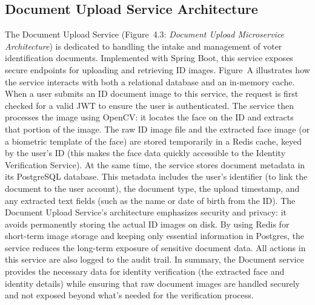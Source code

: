 \documentclass[a4paper,10pt]{report}
\begin{document}
\subsection{Document Upload Service Architecture}
The Document Upload Service (Figure~4.3: \emph{Document Upload Microservice Architecture}) is dedicated to handling the intake and management of voter identification documents. Implemented with Spring Boot, this service exposes secure endpoints for uploading and retrieving ID images. Figure~A illustrates how the service interacts with both a relational database and an in-memory cache. When a user submits an ID document image to this service, the request is first checked for a valid JWT to ensure the user is authenticated. The service then processes the image using OpenCV: it locates the face on the ID and extracts that portion of the image. The raw ID image file and the extracted face image (or a biometric template of the face) are stored temporarily in a Redis cache, keyed by the user’s ID (this makes the face data quickly accessible to the Identity Verification Service). At the same time, the service stores document metadata in its PostgreSQL database. This metadata includes the user’s identifier (to link the document to the user account), the document type, the upload timestamp, and any extracted text fields (such as the name or date of birth from the ID). The Document Upload Service’s architecture emphasizes security and privacy: it avoids permanently storing the actual ID images on disk. By using Redis for short-term image storage and keeping only essential information in Postgres, the service reduces the long-term exposure of sensitive document data. All actions in this service are also logged to the audit trail. In summary, the Document service provides the necessary data for identity verification (the extracted face and identity details) while ensuring that raw document images are handled securely and not exposed beyond what’s needed for the verification process.
\end{document}
